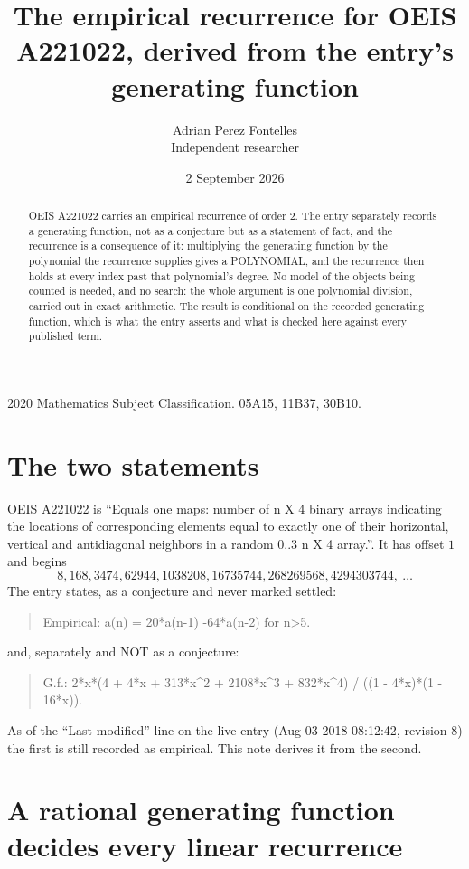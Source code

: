 \documentclass[11pt,a4paper]{article}
\title{The empirical recurrence for OEIS A221022, derived from the entry's generating function}
\author{Adrian Perez Fontelles\\ \small Independent researcher}
\date{2 September 2026}
\theoremstyle{plain}
\theoremstyle{definition}
\begin{document}
\maketitle

\begin{abstract}
OEIS A221022 carries an empirical recurrence of order $2$. The entry separately records a
generating function, not as a conjecture but as a statement of fact, and the recurrence is a
consequence of it: multiplying the generating function by the polynomial the recurrence
supplies gives a POLYNOMIAL, and the recurrence then holds at every index past that
polynomial's degree. No model of the objects being counted is needed, and no search: the
whole argument is one polynomial division, carried out in exact arithmetic. The result is
conditional on the recorded generating function, which is what the entry asserts and what is
checked here against every published term.
\end{abstract}

\noindent\small 2020 Mathematics Subject Classification. 05A15, 11B37, 30B10.\normalsize

\section{The two statements}

OEIS A221022 is ``Equals one maps: number of n X 4 binary arrays indicating the locations of corresponding elements equal to exactly one of their horizontal, vertical and antidiagonal neighbors in a random 0..3 n X 4 array.''. It has offset $1$ and begins
\[
8, 168, 3474, 62944, 1038208, 16735744, 268269568, 4294303744,\ \dots
\]
The entry states, as a conjecture and never marked settled:
\begin{quote}
Empirical: a(n) = 20*a(n-1) -64*a(n-2) for n>5.
\end{quote}
and, separately and NOT as a conjecture:
\begin{quote}
G.f.: 2*x*(4 + 4*x + 313*x\^{}2 + 2108*x\^{}3 + 832*x\^{}4) / ((1 - 4*x)*(1 - 16*x)).
\end{quote}
As of the ``Last modified'' line on the live entry (Aug 03 2018 08:12:42, revision 8) the first is still
recorded as empirical. This note derives it from the second.

\section{A rational generating function decides every linear recurrence}
\end{document}

